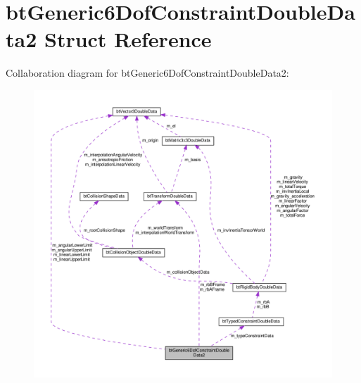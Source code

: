 \hypertarget{structbtGeneric6DofConstraintDoubleData2}{}\section{bt\+Generic6\+Dof\+Constraint\+Double\+Data2 Struct Reference}
\label{structbtGeneric6DofConstraintDoubleData2}


Collaboration diagram for bt\+Generic6\+Dof\+Constraint\+Double\+Data2\+:
\nopagebreak
\begin{figure}[H]
\begin{center}
\leavevmode
\includegraphics[width=350pt]{structbtGeneric6DofConstraintDoubleData2__coll__graph}
\end{center}
\end{figure}

